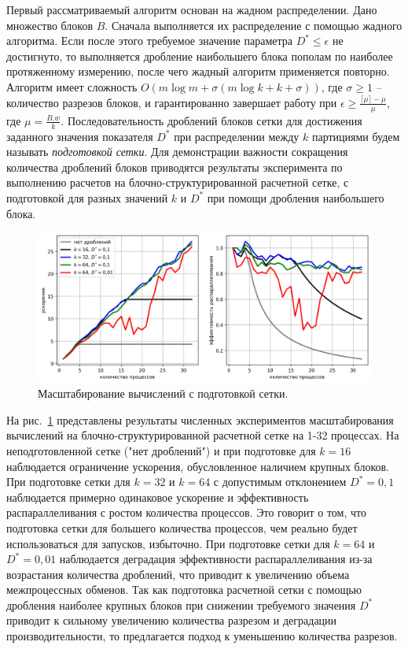 \documentclass[a4paper,14pt]{extarticle}                     %
\theoremstyle{plain}                                         %
\begin{document}
Первый рассматриваемый алгоритм основан на жадном распределении.
Дано множество блоков $B$.
Сначала выполняется их распределение с помощью жадного алгоритма.
Если после этого требуемое значение параметра $D^{*} \le \epsilon$ не достигнуто, то выполняется дробление наибольшего блока пополам по наиболее протяженному измерению, после чего жадный алгоритм применяется повторно.
Алгоритм имеет сложность $O(m \log m + \sigma(m \log k + k + \sigma))$, где $\sigma \ge 1$ -- количество разрезов блоков, и гарантированно завершает работу при $\epsilon \ge \frac{\lceil \mu \rceil - \mu}{\mu}$, где $\mu = \frac{B.w}{k}$. 
Последовательность дроблений блоков сетки для достижения заданного значения показателя $D^{*}$ при распределении между $k$ партициями будем называть \textit{подготовкой сетки}.
Для демонстрации важности сокращения количества дроблений блоков приводятся результаты эксперимента по выполнению расчетов на блочно-структурированной расчетной сетке, с подготовкой для разных значений $k$ и $D^{*}$ при помощи дробления наибольшего блока.

\begin{figure}[ht]
\centering
\includegraphics[width=1.0\textwidth]{./fig/par_scaling_with_prepare.png}
\singlespacing
\caption{Масштабирование вычислений с подготовкой сетки.}
\label{fig:par_scaling_with_prepare}
\end{figure}

На рис.~\ref{fig:par_scaling_with_prepare} представлены результаты численных экспериментов масштабирования вычислений на блочно-структурированной расчетной сетке на 1-32 процессах.
На неподготовленной сетке ("нет дроблений") и при подготовке для $k = 16$ наблюдается ограничение ускорения, обусловленное наличием крупных блоков. 
При подготовке сетки для $k = 32$ и $k = 64$ с допустимым отклонением $D^{*} = 0{,}1$ наблюдается примерно одинаковое ускорение и эффективность распараллеливания с ростом количества процессов.
Это говорит о том, что подготовка сетки для большего количества процессов, чем реально будет использоваться для запусков, избыточно.
При подготовке сетки для $k = 64$ и $D^{*} = 0{,}01$ наблюдается деградация эффективности распараллеливания из-за возрастания количества дроблений, что приводит к увеличению объема межпроцессных обменов.
Так как подготовка расчетной сетки с помощью дробления наиболее крупных блоков при снижении требуемого значения $D^{*}$ приводит к сильному увеличению количества разрезом и деградации производительности, то предлагается подход к уменьшению количества разрезов.
\end{document}
